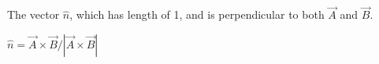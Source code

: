 The vector $\hat{n}$, which has length of 1, and is perpendicular to both $\overrightarrow{A}$ and $\overrightarrow{B}$.

\begin{solution}
    $\hat{n} = \overrightarrow{A} \times \overrightarrow{B} / \left|\overrightarrow{A} \times \overrightarrow{B}\right|$
\end{solution}